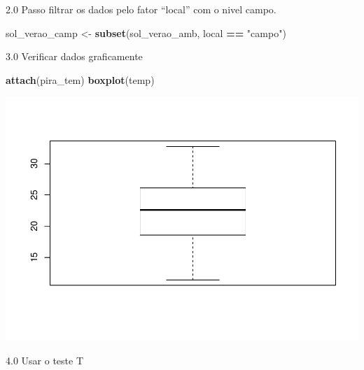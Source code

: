\documentclass[
]{book}
\newenvironment{Shaded}{\begin{snugshade}}{\end{snugshade}}
\newcommand{\CommentTok}[1]{\textcolor[rgb]{0.56,0.35,0.01}{\textit{#1}}}
\newcommand{\DataTypeTok}[1]{\textcolor[rgb]{0.13,0.29,0.53}{#1}}
\newcommand{\DecValTok}[1]{\textcolor[rgb]{0.00,0.00,0.81}{#1}}
\newcommand{\FloatTok}[1]{\textcolor[rgb]{0.00,0.00,0.81}{#1}}
\newcommand{\KeywordTok}[1]{\textcolor[rgb]{0.13,0.29,0.53}{\textbf{#1}}}
\newcommand{\NormalTok}[1]{#1}
\newcommand{\OperatorTok}[1]{\textcolor[rgb]{0.81,0.36,0.00}{\textbf{#1}}}
\newcommand{\StringTok}[1]{\textcolor[rgb]{0.31,0.60,0.02}{#1}}
\begin{document}
2.0 Passo filtrar os dados pelo fator ``local'' com o nivel campo.

\begin{Shaded}
\begin{Highlighting}[]
\NormalTok{ sol_verao_camp <-}\StringTok{ }\KeywordTok{subset}\NormalTok{(sol_verao_amb, local }\OperatorTok{==}\StringTok{ "campo"}\NormalTok{)}
\end{Highlighting}
\end{Shaded}

3.0 Verificar dados graficamente

\begin{Shaded}
\begin{Highlighting}[]
\KeywordTok{attach}\NormalTok{(pira_tem)}
\KeywordTok{boxplot}\NormalTok{(temp)}
\end{Highlighting}
\end{Shaded}

\includegraphics{TudodoR_files/figure-latex/unnamed-chunk-248-1.pdf}

4.0 Usar o teste T

\begin{Shaded}
\end{Shaded}
\end{document}

